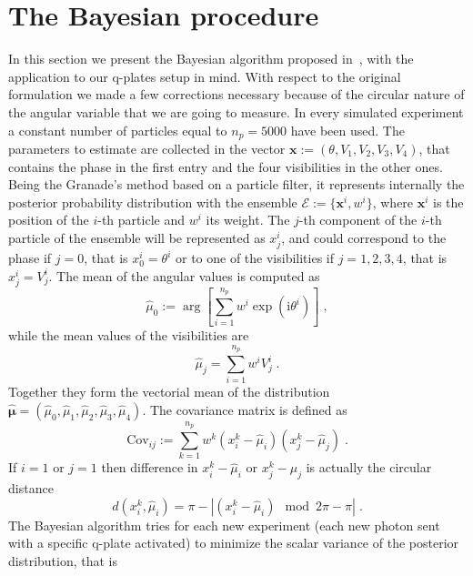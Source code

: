 \documentclass[aps, pra, 10pt, twocolumn, superscriptaddress,floatfix]{revtex4-1}
\newcommand{\mi}{\mathrm{i}} %
\begin{document}
\section{The Bayesian procedure}
%
In this section we present the Bayesian algorithm proposed in~\cite{Granade2012}, with the application to our q-plates setup in mind. With respect to the original formulation we made a few corrections necessary because of the circular nature of the angular variable that we are going to measure. In every simulated experiment  a constant number of particles equal to $n_p = 5000$ have been used. The parameters to estimate are collected in the vector $\boldsymbol{x} := \left( \theta, V_1, V_2, V_3, V_4 \right)$, that contains the phase in the first entry and the four visibilities in the other ones. Being the Granade's method based on a particle filter, it represents internally the posterior probability distribution with the ensemble $\mathcal{E} := \lbrace \boldsymbol{x}^i, w^i \rbrace$, where $\boldsymbol{x}^i$ is the position of the $i$-th particle and $w^i$ its weight. The $j$-th component of the $i$-th particle of the ensemble will be represented as $x_j^i$, and could correspond to the phase if $j=0$, that is $x^i_0 = \theta^i$ or to one of the visibilities if $j=1, 2, 3, 4$, that is $x^i_j = V^i_j$. The mean of the angular values is computed as
%
\begin{equation}
	\hat{\mu}_0 := \arg \left[ \sum_{i=1}^{n_{p}} w^i \exp \left( \mi \theta^i \right) \right] \; ,
\end{equation}
%
while the mean values of the visibilities are
%
\begin{equation}
	\hat{\mu}_j = \sum_{i=1}^{n_p} w^i V^i_j \; .
\end{equation}
%
Together they form the vectorial mean of the distribution $\boldsymbol{\hat{\mu}} = (\hat{\mu}_0, \hat{\mu}_1, \hat{\mu}_2, \hat{\mu}_3, \hat{\mu}_4)$. The covariance matrix is defined as
%
\begin{equation}
	\text{Cov}_{ij} := \sum_{k=1}^{n_{p}} w^k (x^k_i - \hat{\mu}_i)  (x^k_j - \hat{\mu}_j) \; .
\end{equation}
%
If $i=1$ or $j=1$ then difference in $x^k_i - \hat{\mu}_i$ or $x^k_j - \hat{\mu}_j$ is actually the circular distance
%
\begin{equation}
	d(x^k_i, \hat{\mu}_i) = \pi - | (x^k_i - \hat{\mu}_i) \mod 2 \pi - \pi| \; .
\end{equation}
%
The Bayesian algorithm tries for each new experiment (each new photon sent with a specific q-plate activated) to minimize the scalar variance of the posterior distribution, that is
\end{document}
